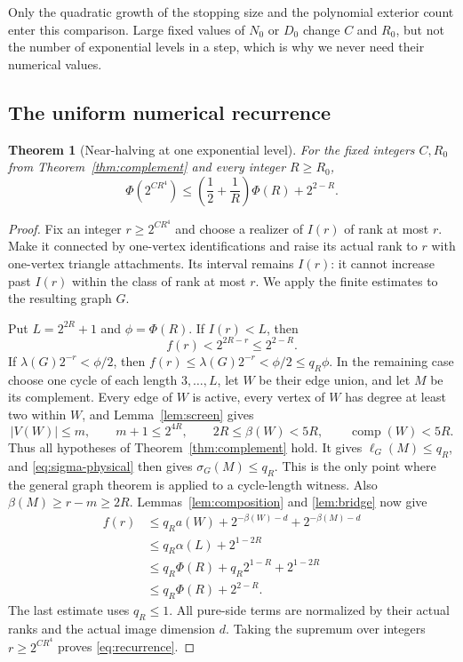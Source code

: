 \documentclass[11pt,a4paper]{article}
\numberwithin{equation}{section}
\newtheorem{theorem}{Theorem}[section]
\theoremstyle{definition}
\theoremstyle{remark}
\newcommand{\cc}{\operatorname{comp}}
\begin{document}
Only the quadratic growth of the stopping size and the polynomial exterior count enter this comparison. Large fixed values of $N_0$ or $D_0$ change $C$ and $R_0$, but not the number of exponential levels in a step, which is why we never need their numerical values.

\subsection{The uniform numerical recurrence}
\begin{theorem}[Near-halving at one exponential level]\label{thm:recurrence}
For the fixed integers $C,R_0$ from Theorem~\ref{thm:complement} and every integer $R\ge R_0$,
\begin{equation}\label{eq:recurrence}
 \Phi(2^{CR^4})\le\left(\frac12+\frac1R\right)\Phi(R)+2^{2-R}.
\end{equation}
\end{theorem}
\begin{proof}
Fix an integer $r\ge2^{CR^4}$ and choose a realizer of $I(r)$ of rank at most $r$. Make it connected by one-vertex identifications and raise its actual rank to $r$ with one-vertex triangle attachments. Its interval remains $I(r)$: it cannot increase past $I(r)$ within the class of rank at most $r$. We apply the finite estimates to the resulting graph $G$.

Put $L=2^{2R}+1$ and $\phi=\Phi(R)$. If $I(r)<L$, then
\[
 f(r)<2^{2R-r}\le2^{2-R}.
\]
If $\lambda(G)2^{-r}<\phi/2$, then $f(r)\le\lambda(G)2^{-r}<\phi/2\le q_R\phi$. In the remaining case choose one cycle of each length $3,\ldots,L$, let $W$ be their edge union, and let $M$ be its complement. Every edge of $W$ is active, every vertex of $W$ has degree at least two within $W$, and Lemma~\ref{lem:screen} gives
\[
 |V(W)|\le m,\qquad m+1\le2^{4R},\qquad
 2R\le\beta(W)<5R,\qquad \cc(W)<5R.
\]
Thus all hypotheses of Theorem~\ref{thm:complement} hold. It gives $\ell_G(M)\le q_R$, and \eqref{eq:sigma-physical} then gives $\sigma_G(M)\le q_R$. This is the only point where the general graph theorem is applied to a cycle-length witness. Also $\beta(M)\ge r-m\ge2R$. Lemmas~\ref{lem:composition} and \ref{lem:bridge} now give
\begin{align*}
 f(r)&\le q_Ra(W)+2^{-\beta(W)-d}+2^{-\beta(M)-d}\\
     &\le q_R\alpha(L)+2^{1-2R}\\
     &\le q_R\Phi(R)+q_R2^{1-R}+2^{1-2R}\\
     &\le q_R\Phi(R)+2^{2-R}.
\end{align*}
The last estimate uses $q_R\le1$. All pure-side terms are normalized by their actual ranks and the actual image dimension $d$. Taking the supremum over integers $r\ge2^{CR^4}$ proves \eqref{eq:recurrence}.
\end{proof}
\end{document}
